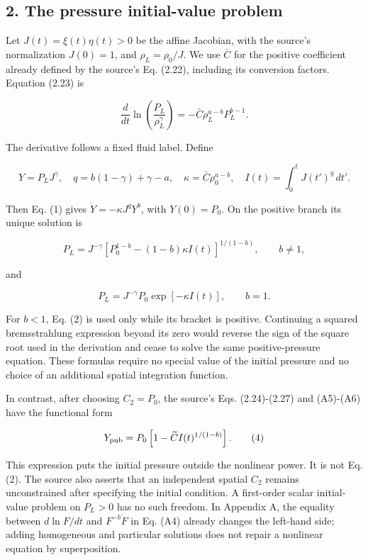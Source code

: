 \subsection{2. The pressure initial-value
problem}\label{the-pressure-initial-value-problem}

Let \(J(t)=\xi(t)\eta(t)>0\) be the affine Jacobian, with the source's
normalization \(J(0)=1\), and \(\rho_L=\rho_0/J\). We use \(\bar C\) for
the positive coefficient already defined by the source's Eq. (2.22),
including its conversion factors. Equation (2.23) is

\[
\frac{d}{dt}\ln\left(\frac{P_L}{\rho_L^\gamma}\right)
=-\bar C\rho_L^{a-b}P_L^{b-1}. \tag{1}
\]

The derivative follows a fixed fluid label. Define

\[
Y=P_LJ^\gamma,\quad q=b(1-\gamma)+\gamma-a,\quad
\kappa=\bar C\rho_0^{a-b},\quad I(t)=\int_0^t J(t')^q\,dt'.
\]

Then Eq. (1) gives \(\dot Y=-\kappa J^qY^b\), with \(Y(0)=P_0\). On the
positive branch its unique solution is

\[
P_L=J^{-\gamma}
\left[P_0^{1-b}-(1-b)\kappa I(t)\right]^{1/(1-b)},
\qquad b\ne1, \tag{2}
\]

and

\[
P_L=J^{-\gamma}P_0\exp[-\kappa I(t)],\qquad b=1. \tag{3}
\]

For \(b<1\), Eq. (2) is used only while its bracket is positive.
Continuing a squared bremsstrahlung expression beyond its zero would
reverse the sign of the square root used in the derivation and cease to
solve the same positive-pressure equation. These formulas require no
special value of the initial pressure and no choice of an additional
spatial integration function.

In contrast, after choosing \(C_2=P_0\), the source's Eqs. (2.24)-(2.27)
and (A5)-(A6) have the functional form

\[
Y_{\rm pub}=P_0\left[1-\widetilde C I(t)^{1/(1-b)}\right]. \tag{4}
\]

This expression puts the initial pressure outside the nonlinear power.
It is not Eq. (2). The source also asserts that an independent spatial
\(C_2\) remains unconstrained after specifying the initial condition. A
first-order scalar initial-value problem on \(P_L>0\) has no such
freedom. In Appendix A, the equality between \(d\ln F/dt\) and
\(F^{-b}\dot F\) in Eq. (A4) already changes the left-hand side; adding
homogeneous and particular solutions does not repair a nonlinear
equation by superposition.

